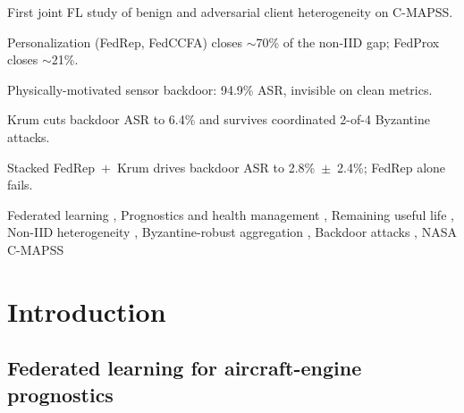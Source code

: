 \documentclass[preprint,12pt,authoryear]{elsarticle}
\begin{document}
\begin{frontmatter}
\begin{highlights}
\item First joint FL study of benign and adversarial client heterogeneity on C-MAPSS.
\item Personalization (FedRep, FedCCFA) closes $\sim$70\% of the non-IID gap; FedProx closes $\sim$21\%.
\item Physically-motivated sensor backdoor: 94.9\% ASR, invisible on clean metrics.
\item Krum cuts backdoor ASR to 6.4\% and survives coordinated 2-of-4 Byzantine attacks.
\item Stacked FedRep~$+$~Krum drives backdoor ASR to 2.8\%~$\pm$~2.4\%; FedRep alone fails.
\end{highlights}

\begin{keyword}
Federated learning \sep
Prognostics and health management \sep
Remaining useful life \sep
Non-IID heterogeneity \sep
Byzantine-robust aggregation \sep
Backdoor attacks \sep
NASA C-MAPSS
\end{keyword}

\end{frontmatter}


\section{Introduction}
\label{sec:intro}

\subsection{Federated learning for aircraft-engine prognostics}
\label{subsec:motivation}
\end{document}
